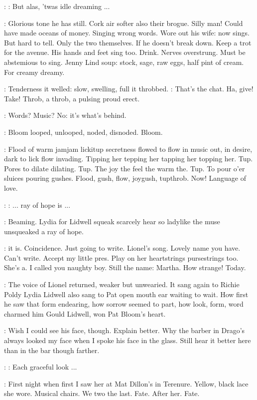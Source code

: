 \Simon:
\Song:
But alas, 'twas idle dreaming ...

\BloomInt:
Glorious tone he has still. Cork air softer also their brogue. Silly man!
Could have made oceans of money. Singing wrong words. Wore out his
wife: now sings. But hard to tell. Only the two themselves. If he doesn't
break down. Keep a trot for the avenue. His hands and feet sing too.
Drink. Nerves overstrung. Must be abstemious to sing. Jenny Lind soup:
stock, sage, raw eggs, half pint of cream.
For creamy dreamy.

:
Tenderness it welled: slow, swelling, full it throbbed.
\BloomInt:
That's the chat.
Ha, give! Take! Throb, a throb, a pulsing proud erect.

\BloomInt:
Words? Music? No: it's what's behind.

:
Bloom looped, unlooped, noded, disnoded. Bloom.

\BloomInt:
Flood of warm jamjam lickitup secretness flowed to flow in
music out, in desire, dark to lick flow invading. Tipping her tepping her
tapping her topping her. Tup. Pores to dilate dilating. Tup. The joy the
feel the warm the. Tup. To pour o'er sluices pouring gushes. Flood, gush,
flow, joygush, tupthrob. Now! Language of love.

\Simon:
\Song:
... ray of hope is ...

:
Beaming. Lydia for Lidwell squeak scarcely hear so ladylike the muse unsqueaked a ray of hope.

\BloomInt:
 it is. Coincidence. Just going to write.
Lionel's song. Lovely
name you have. Can't write. Accept my little pres. Play on her
heartstrings pursestrings too. She's a. I called you naughty boy. Still
the name: Martha. How strange! Today.

:
The voice of Lionel returned, weaker but unwearied. It sang again to
Richie Poldy Lydia Lidwell also sang to Pat open mouth ear waiting to
wait. How first he saw that form endearing, how sorrow seemed to part,
how look, form, word charmed him
Gould Lidwell, won Pat Bloom's heart.

\BloomInt:
Wish I could see his face, though. Explain better. Why the barber in
Drago's always looked my face when I spoke his face in the glass. Still
hear it better here than in the bar though farther.

\Simon:
\Song:
Each graceful look ...

\BloomInt:
First night when first I saw her at Mat Dillon's in Terenure. Yellow,
black lace she wore. Musical chairs. We two the last. Fate. After her.
Fate.

